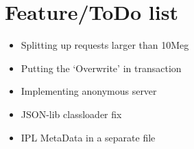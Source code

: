 \section{Feature/ToDo list}
\begin{itemize}
  \item Splitting up requests larger than 10Meg
  \item Putting the `Overwrite' in transaction
  \item Implementing anonymous server
  \item JSON-lib classloader fix
  \item IPL MetaData in a separate file
\end{itemize}